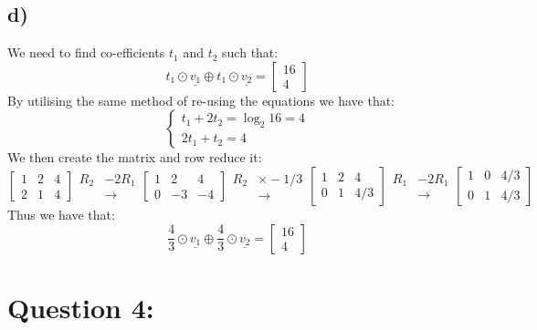 \documentclass{article}
\begin{document}
\subsection*{d)}
We need to find co-efficients $t_{1}$ and $t_{2}$ such that: $$t_{1}\odot\underline{v_{1}}\oplus t_{1}\odot\underline{v_{2}}=\begin{bmatrix} 
16\\4
\end{bmatrix}$$
By utilising the same method of re-using the equations we have that:$$\begin{cases}
t_{1}+2t_{2}=\log_{2}{16}=4\\
2t_{1}+t_{2}=4
\end{cases}$$
We then create the matrix and row reduce it: $$\left[\begin{array}{cc|c}
   1&2&4\\
   2&1&4
\end{array}\right]\begin{aligned}
    R_{2}&-2R_{1}\\
    &\rightarrow
\end{aligned}\left[\begin{array}{cc|c}
   1&2&4\\ 
   0&-3&-4
\end{array}\right]\begin{aligned}
    R_{2}&\times -1/3\\
    &\rightarrow
\end{aligned}\left[\begin{array}{cc|c}
1&2&4\\
0&1&4/3
\end{array}\right]\begin{aligned}
    R_{1}&-2R_{1}\\
    &\rightarrow
\end{aligned}\left[\begin{array}{cc|c}
1&0&4/3\\
0&1&4/3
\end{array}\right]$$
Thus we have that:$$\frac{4}{3}\odot\underline{v_{1}}\oplus\frac{4}{3}\odot\underline{v_{2}}=\begin{bmatrix} 
16\\4
\end{bmatrix}$$
\newpage
\section*{Question 4:}
\end{document}
